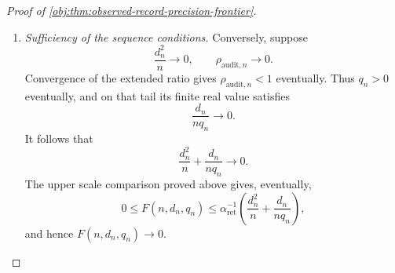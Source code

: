 \documentclass[11pt]{article}
\begin{document}
\begin{proof}[Proof of \cref{obj:thm:observed-record-precision-frontier}]
\begin{enumerate}
For the lower truncated comparison, if \(d^2/(np)\ge1\), then
\[
\frac12\min\left\{1,\frac{d^2}{n}+\frac{d}{nq}\right\}
\le1=F(n,d,q).
\]
If \(d^2/(np)<1\), then
\[
\frac12\min\left\{1,\frac{d^2}{n}+\frac{d}{nq}\right\}
\le\frac12\left(\frac{d^2}{n}+\frac{d}{nq}\right)
\le\frac{d^2}{np}
=F(n,d,q).
\]
For the upper comparison, \(0<\alpha_{\mathrm{ret}}<1\) gives both
\[
\alpha_{\mathrm{ret}}F(n,d,q)\le1,
\qquad
\alpha_{\mathrm{ret}}F(n,d,q)
\le\alpha_{\mathrm{ret}}\frac{d^2}{np}
\le\frac{d^2}{n}+\frac{d}{nq}.
\]
Combining these inequalities proves
\[
\frac12\min\left\{1,\frac{d^2}{n}+\frac{d}{nq}\right\}
\le F(n,d,q)
\le
\alpha_{\mathrm{ret}}^{-1}
\min\left\{1,\frac{d^2}{n}+\frac{d}{nq}\right\}.
\]

Since \(F(n,d_n,q_n)\to0\), eventually
\[
F(n,d_n,q_n)<\frac12.
\]
The zero-retention identity then forces \(q_n>0\) eventually. On that tail,
the lower comparison implies
\[
\frac{d_n^2}{n}+\frac{d_n}{nq_n}<1:
\]
otherwise its truncated value would be \(1\), forcing
\(F(n,d_n,q_n)\ge1/2\). Removing the truncation now yields
\[
0\le\frac{d_n^2}{n}
\le\frac{d_n^2}{n}+\frac{d_n}{nq_n}
\le2F(n,d_n,q_n),
\]
and
\[
0\le\frac{d_n}{nq_n}
\le\frac{d_n^2}{n}+\frac{d_n}{nq_n}
\le2F(n,d_n,q_n).
\]
Both real ratios therefore tend to zero.

Define the extended audit ratio for every \(n\ge4\) by
\[
\rho_{\mathrm{audit},n}
=
\begin{cases}
+\infty,&q_n=0,\\[2pt]
\dfrac{d_n}{nq_n},&q_n>0.
\end{cases}
\]
It agrees eventually with the second real ratio, so
\[
\frac{d_n^2}{n}\longrightarrow0,
\qquad
\rho_{\mathrm{audit},n}\longrightarrow0.
\]

\item \textit{Sufficiency of the sequence conditions.}
Conversely, suppose
\[
\frac{d_n^2}{n}\longrightarrow0,
\qquad
\rho_{\mathrm{audit},n}\longrightarrow0.
\]
Convergence of the extended ratio gives
\(\rho_{\mathrm{audit},n}<1\) eventually. Thus \(q_n>0\) eventually,
and on that tail its finite real value satisfies
\[
\frac{d_n}{nq_n}\longrightarrow0.
\]
It follows that
\[
\frac{d_n^2}{n}+\frac{d_n}{nq_n}\longrightarrow0.
\]
The upper scale comparison proved above gives, eventually,
\[
0\le F(n,d_n,q_n)
\le\alpha_{\mathrm{ret}}^{-1}
\left(\frac{d_n^2}{n}+\frac{d_n}{nq_n}\right),
\]
and hence \(F(n,d_n,q_n)\to0\).


\end{enumerate}
\end{proof}
\end{document}
